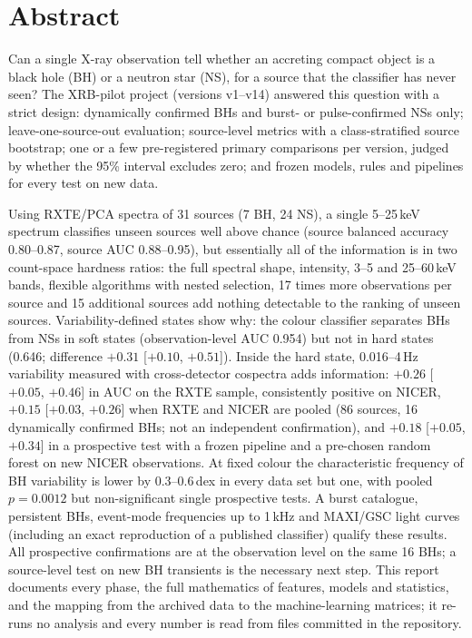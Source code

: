 \chapter*{Abstract}
Can a single X-ray observation tell whether an accreting compact object is a black hole (BH) or a neutron star (NS), for a source
that the classifier has never seen? The XRB-pilot project (versions v1--v14) answered this question with a strict design:
dynamically confirmed BHs and burst- or pulse-confirmed NSs only; leave-one-source-out evaluation; source-level metrics with a
class-stratified source bootstrap; one or a few pre-registered primary comparisons per version, judged by whether the 95\%
interval excludes zero; and frozen models, rules and pipelines for every test on new data.

Using RXTE/PCA spectra of 31 sources (7 BH, 24 NS), a single 5--25\,keV spectrum classifies unseen sources well above chance
(source balanced accuracy 0.80--0.87, source AUC 0.88--0.95), but essentially all of the information is in two count-space
hardness ratios: the full spectral shape, intensity, 3--5 and 25--60\,keV bands, flexible algorithms with nested selection, 17 times
more observations per source and 15 additional sources add nothing detectable to the ranking of unseen sources. Variability-defined states show why: the colour
classifier separates BHs from NSs in soft states (observation-level AUC 0.954) but not in hard states (0.646; difference
$+0.31$ [$+0.10$, $+0.51$]). Inside the hard state, 0.016--4\,Hz variability measured with cross-detector cospectra adds
information: $+0.26$ [$+0.05$, $+0.46$] in AUC on the RXTE sample, consistently positive on NICER, $+0.15$ [$+0.03$, $+0.26$] when
RXTE and NICER are pooled (86 sources, 16 dynamically confirmed BHs; not an independent confirmation), and $+0.18$
[$+0.05$, $+0.34$] in a prospective test with a frozen pipeline and a pre-chosen random forest on new NICER observations. At fixed
colour the characteristic frequency of BH variability is lower by 0.3--0.6\,dex in every data set but one, with pooled $p=0.0012$
but non-significant single prospective tests. A burst catalogue, persistent BHs, event-mode frequencies up to 1\,kHz and MAXI/GSC
light curves (including an exact reproduction of a published classifier) qualify these results. All prospective confirmations are
at the observation level on the same 16 BHs; a source-level test on new BH transients is the necessary next step. This report
documents every phase, the full mathematics of features, models and statistics, and the mapping from the archived data to the
machine-learning matrices; it re-runs no analysis and every number is read from files committed in the repository.
